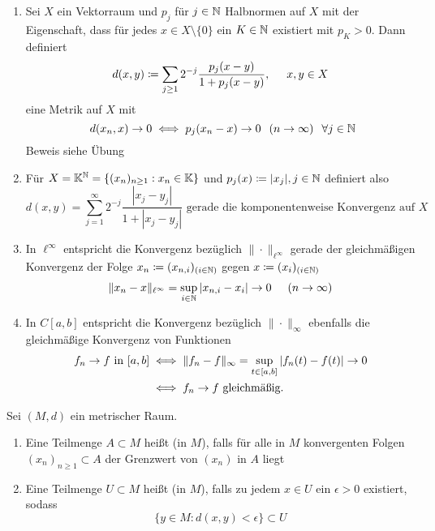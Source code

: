 \begin{beispiel}  \label{bsp:4.3}
	\begin{enumerate}[label=\alph*\upshape)]	
		\item Sei $X$ ein Vektorraum und $p_{j}$ für $j \in \mathbb{N}$ Halbnormen auf $X$ mit der Eigenschaft, dass für jedes $x \in X \setminus \{ 0 \}$ ein $K \in \mathbb{N}$ existiert mit $p_{K} > 0$. Dann definiert
			\[ d(x, y) \coloneqq \sum_{j \geq 1} 2^{-j} \frac{p_{j}(x - y)}{1 + p_{j}(x -y)}, \hspace{0.5cm} x, y \in X \]
			eine Metrik auf $X$ mit
			\[ d(x_{n}, x) \rightarrow 0 \gdw p_{j}(x_{n} - x) \rightarrow 0 \hspace{0.25cm} (n \rightarrow  \infty) \hspace{0.25cm} \forall j \in \MdN \]
			Beweis siehe Übung
		\item Für $X = \mathbb{K}^{\mathbb{N}} = \{ (x_{n})_{n \geq 1}: x_{n} \in \mathbb{K} \}$ und $p_{j}(x) \coloneqq |x_{j}|, j \in \mathbb{N}$ definiert also
			\[ d(x, y) = \sum_{j = 1}^{\infty} 2^{-j} \frac{|x_{j} - y_{j}|}{1 + |x_{j} - y_{j}|} \text{ gerade die komponentenweise Konvergenz auf } X \]
		\item In $\ell^{\infty}$ entspricht die Konvergenz bezüglich $\| \cdot \|_{\ell^{\infty}}$ gerade der gleichmä{\ss}igen Konvergenz der Folge $x_{n} \coloneqq (x_{n, i})_{(i \in \mathbb{N})}$ gegen $x \coloneqq (x_{i})_{(i \in \mathbb{N})}$
			\[ \| x_{n} - x \|_{\ell^{\infty}} = \sup_{i \in \mathbb{N}} | x_{n, i} - x_{i} | \rightarrow 0 \hspace{0.5cm} (n \rightarrow \infty) \]
		\item In $C[a, b]$ entspricht die Konvergenz bezüglich $\| \cdot \|_{\infty}$ ebenfalls die gleichmä{\ss}ige Konvergenz von Funktionen
			\begin{align*}
				f_{n} \rightarrow f \text{ in } [a, b] & \iff \| f_{n} - f \|_{\infty} = \sup_{t \in [a, b]} |f_{n}(t) - f(t) | \rightarrow 0 \\
				& \iff f_{n} \rightarrow f \text{ gleichmä{\ss}ig.}
			\end{align*}
	\end{enumerate}
\end{beispiel}


\begin{definition} \label{def:4.4-AbgeschlossenOffen}
	Sei $(M, d)$ ein metrischer Raum.
	\begin{enumerate}[label=\alph*\upshape)]
		\item Eine Teilmenge $A \subset M$ hei{\ss}t  (in $M$), falls für alle in $M$ konvergenten Folgen $(x_{n})_{n \geq 1} \subset A$ der Grenzwert von $(x_{n})$ in $A$ liegt
		\item Eine Teilmenge $U \subset M$ hei{\ss}t  (in $M$), falls zu jedem $x \in U$ ein $\epsilon > 0$ existiert, sodass
			\[ \{ y \in M: d(x, y) < \epsilon \} \subset U \]
	\end{enumerate}
\end{definition}


